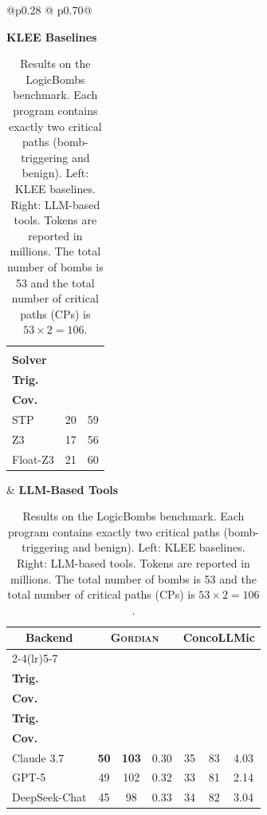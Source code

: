 \documentclass[acmsmall,screen,nonacm]{acmart}
\newcommand{\projName}{\textsc{Gordian}\xspace}
\theoremstyle{definition}
\begin{document}
\begin{table}[t!]
\centering
\caption{Results on the LogicBombs benchmark.
Each program contains exactly two critical paths (bomb-triggering and benign).
Left: KLEE baselines.
Right: LLM-based tools.
Tokens are reported in millions.
The total number of bombs is 53 and the total number of critical paths (CPs) is
$53 \times 2 = 106$.}
\label{tab:logic-bombs-summary}
\footnotesize
\vspace{-2mm}
\begin{tabular}{@{}p{}
@{\hspace{0.00\columnwidth}}
p{}@{}}

\raggedright
\centering\textbf{KLEE Baselines}\par\vspace{2pt}
\centering
\begin{tabular}{|l|cc|}
\toprule
\multicolumn{3}{|c|}{\rule{0pt}{3.2ex}} \\  %
\textbf{Solver}
& \makecell{\textbf{Bombs}\\\textbf{Trig.}}
& \makecell{\textbf{CPs}\\\textbf{Cov.}} \\
\midrule
STP        & 20 & 59 \\
Z3         & 17 & 56 \\
Float-Z3   & 21 & 60 \\
\bottomrule
\end{tabular}

&
\centering\textbf{LLM-Based Tools}\par\vspace{2pt}
\centering
\begin{tabular}{|l|ccc|ccc|}
\toprule
\multicolumn{1}{|c|}{\textbf{Backend}}
& \multicolumn{3}{c|}{\textbf{\projName{}}}
& \multicolumn{3}{c|}{\textbf{ConcoLLMic}} \\
\cmidrule(lr){2-4}\cmidrule(lr){5-7}
& \makecell{\textbf{Bombs}\\\textbf{Trig.}}
& \makecell{\textbf{CPs}\\\textbf{Cov.}}
& \makecell{\textbf{Tokens}}
& \makecell{\textbf{Bombs}\\\textbf{Trig.}}
& \makecell{\textbf{CPs}\\\textbf{Cov.}}
& \makecell{\textbf{Tokens}} \\
\midrule
Claude 3.7
& \textbf{50} & \textbf{103} & 0.30
& 35 & 83 & 4.03 \\

GPT-5
& 49 & 102 & 0.32
& 33 & 81 & 2.14 \\

DeepSeek-Chat
& 45 & 98 & 0.33
& 34 & 82 & 3.04 \\
\bottomrule
\end{tabular}

\end{tabular}
\vspace{-4mm}
\end{table}
\end{document}
